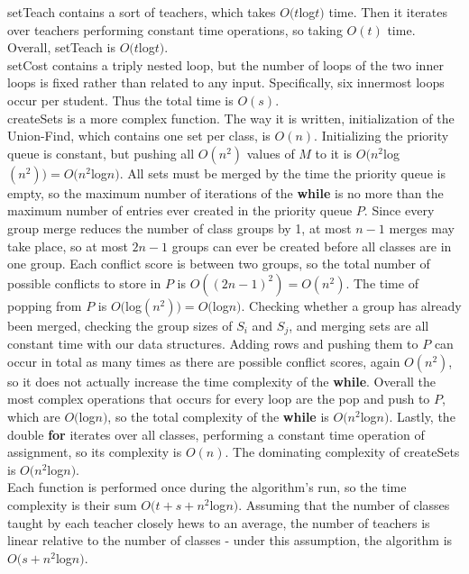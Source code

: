 \documentclass[11pt, oneside]{article}   	%
\begin{document}
setTeach contains a sort of teachers, which takes $O(t$log$t)$ time. Then it iterates over teachers performing constant time operations, so taking $O(t)$ time. Overall, setTeach is $O(t$log$t)$. \\

setCost contains a triply nested loop, but the number of loops of the two inner loops is fixed rather than related to any input. Specifically, six innermost loops occur per student. Thus the total time is $O(s)$. \\

createSets is a more complex function. The way it is written, initialization of the Union-Find, which contains one set per class, is $O(n)$. Initializing the priority queue is constant, but pushing all $O(n^2)$ values of $M$ to it is $O(n^2$log$(n^2)) = O(n^2$log$n)$. All sets must be merged by the time the priority queue is empty, so the maximum number of iterations of the \textbf{while} is no more than the maximum number of entries ever created in the priority queue $P$. Since every group merge reduces the number of class groups by 1, at most $n-1$ merges may take place, so at most $2n-1$ groups can ever be created before all classes are in one group. Each conflict score is between two groups, so the total number of possible conflicts to store in $P$ is $O((2n-1)^2) = O(n^2)$. The time of popping from $P$ is $O($log$(n^2)) = O($log$n)$. Checking whether a group has already been merged, checking the group sizes of $S_i$ and $S_j$, and merging sets are all constant time with our data structures. Adding rows and pushing them to $P$ can occur in total as many times as there are possible conflict scores, again $O(n^2)$, so it does not actually increase the time complexity of the \textbf{while}. Overall the most complex operations that occurs for every loop are the pop and push to $P$, which are $O($log$n)$, so the total complexity of the \textbf{while} is $O(n^2$log$n)$. Lastly, the double \textbf{for} iterates over all classes, performing a constant time operation of assignment, so its complexity is $O(n)$. The dominating complexity of createSets is $O(n^2$log$n)$. \\

Each function is performed once during the algorithm's run, so the time complexity is their sum $O(t+s+n^2$log$n)$. Assuming that the number of classes taught by each teacher closely hews to an average, the number of teachers is linear relative to the number of classes - under this assumption, the algorithm is $O(s + n^2$log$n)$. \\
\end{document}
